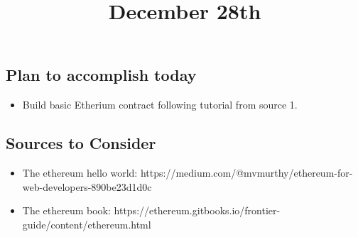 \title{December 28th}

\subsection{Plan to accomplish today}

\begin{itemize}
	\item Build basic Etherium contract following tutorial from source 1. 
\end{itemize}


\subsection{Sources to Consider}

\begin{itemize}
	\item The ethereum hello world: https://medium.com/@mvmurthy/ethereum-for-web-developers-890be23d1d0c
	\item The ethereum book: https://ethereum.gitbooks.io/frontier-guide/content/ethereum.html
\end{itemize}	
